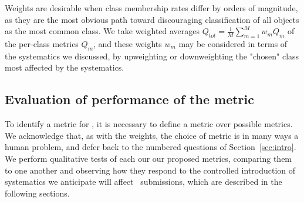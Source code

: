 
Weights are desirable when class membership rates differ by orders of magnitude, as they are the most obvious path toward discouraging classification of all objects as the most common class.
We take weighted averages $Q_{tot} = \frac{1}{M}\sum_{m=1}^{M}w_{m}Q_{m}$ of the per-class metrics $Q_{m}$, and these weights $w_{m}$ may be considered in terms of the systematics we discussed, by upweighting or downweighting the "chosen" class most affected by the systematics.

\subsection{Evaluation of performance of the metric}
\label{sec:inception}

To identify a metric for \plasticc, it is necessary to define a metric over possible metrics.
We acknowledge that, as with the weights, the choice of metric is in many ways a human problem, and defer back to the numbered questions of Section~\ref{sec:intro}.
We perform qualitative tests of each our our proposed metrics, comparing them to one another and observing how they respond to the controlled introduction of systematics we anticipate will affect \plasticc\ submissions, which are described in the following sections.
